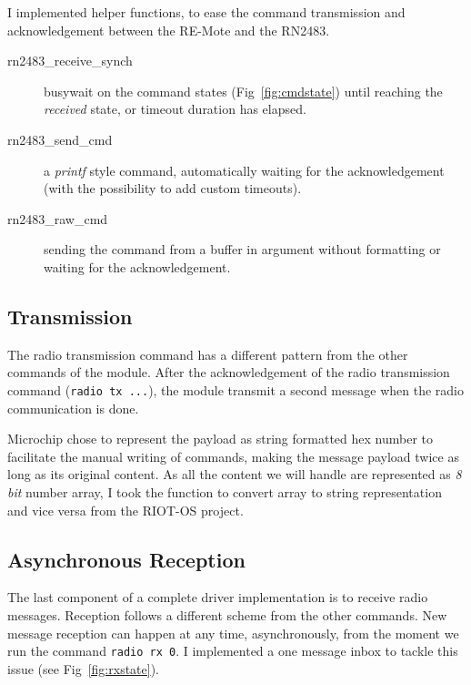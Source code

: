 
I implemented helper functions, to ease the command transmission and
acknowledgement between the RE-Mote and the RN2483.

\begin{description}
  \item[rn2483\_receive\_synch] busywait on the command states
    (Fig~\ref{fig:cmdstate}) until reaching the \emph{received} state, 
    or timeout duration has elapsed.
  \item[rn2483\_send\_cmd] a \emph{printf} style command, automatically 
    waiting for the acknowledgement (with the possibility to add custom timeouts).
  \item[rn2483\_raw\_cmd] sending the command from a buffer in argument
    without formatting or waiting for the acknowledgement.
\end{description}



\subsection{Transmission}

The radio transmission command has a different pattern from the other commands 
of the module. 
After the acknowledgement of the radio transmission command (\lstinline{radio tx ...}),
the module transmit a second message when the radio communication is done.



Microchip chose to represent the payload as string formatted hex number to
facilitate the manual writing of commands, making the message payload twice as
long as its original content. 
As all the content we will handle are represented as \emph{8 bit} number array, 
I took the function to convert array to string representation and vice versa
from the RIOT-OS project.

\subsection{Asynchronous Reception}

The last component of a complete driver implementation is to receive radio
messages.
Reception follows a different scheme from the other commands. 
New message reception can happen at any time, asynchronously, from the moment
we run the command \lstinline{radio rx 0}.
I implemented a one message inbox to tackle this issue (see Fig~\ref{fig:rxstate}).

